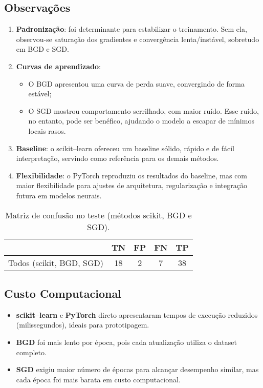 \documentclass[a4paper]{article}
\begin{document}
\begin{answer}[Ítem 1.2]
\subsection*{Observações}
\begin{enumerate}
    \item \textbf{Padronização}: foi determinante para estabilizar o treinamento. Sem ela, observou-se saturação dos gradientes e convergência lenta/instável, sobretudo em BGD e SGD.
    \item \textbf{Curvas de aprendizado}: 
    \begin{itemize}
        \item O BGD apresentou uma curva de perda suave, convergindo de forma estável;
        \item O SGD mostrou comportamento serrilhado, com maior ruído. Esse ruído, no entanto, pode ser benéfico, ajudando o modelo a escapar de mínimos locais rasos.
    \end{itemize}
    \item \textbf{Baseline}: o scikit--learn ofereceu um baseline sólido, rápido e de fácil interpretação, servindo como referência para os demais métodos.
    \item \textbf{Flexibilidade}: o PyTorch reproduziu os resultados do baseline, mas com maior flexibilidade para ajustes de arquitetura, regularização e integração futura em modelos neurais.
\end{enumerate}

\begin{table}[H]
\centering
\caption{Matriz de confusão no teste (métodos scikit, BGD e SGD).}
\begin{tabular}{lcccc}
\toprule
 & TN & FP & FN & TP \\
\midrule
Todos (scikit, BGD, SGD) & 18 & 2 & 7 & 38 \\
\bottomrule
\end{tabular}
\end{table}

\subsection*{Custo Computacional}
\begin{itemize}
    \item \textbf{scikit--learn} e \textbf{PyTorch} direto apresentaram tempos de execução reduzidos (milissegundos), ideais para prototipagem.
    \item \textbf{BGD} foi mais lento por época, pois cada atualização utiliza o dataset completo.
    \item \textbf{SGD} exigiu maior número de épocas para alcançar desempenho similar, mas cada época foi mais barata em custo computacional.
\end{itemize}


\end{answer}
\end{document}
